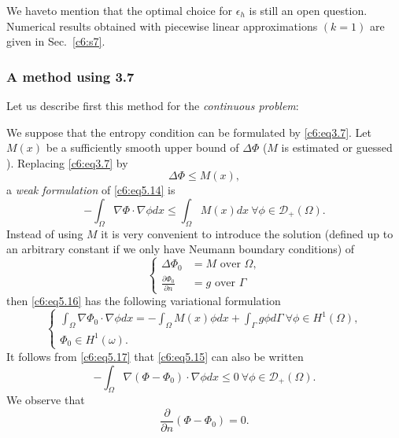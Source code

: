 We have\pageoriginale  to mention that the optimal choice for $\epsilon_h$ is still 
an open question. Numerical results obtained with piecewise linear 
approximations $(k=1)$ are given in Sec.~\ref{c6:s7}.  

\subsubsection{A method using 3.7}\label{c6:sss5.3.2}
Let us describe first this method for the \textit{continuous problem}: 

We suppose that the entropy condition can be formulated by 
\eqref{c6:eq3.7}. Let $M(x)$ be a sufficiently smooth upper bound of 
$\Delta \Phi$ ($M$ is estimated or guessed ). Replacing \eqref{c6:eq3.7} by   
\begin{equation}
\Delta \Phi \leq M (x),\tag{5.14}\label{c6:eq5.14}
\end{equation}
a \textit{weak formulation} of \eqref{c6:eq5.14} is 
\begin{equation}
- \int_\Omega \nabla \Phi \cdot \nabla \phi dx \leq 
\int_\Omega M(x) dx~ \forall \phi \in \mathscr{D}_+ (\Omega ).  
\tag{5.15}\label{c6:eq5.15}  
\end{equation}
Instead of using $M$ it is very convenient to introduce the solution 
(defined up to an arbitrary constant if we only have Neumann boundary 
conditions) of   
\begin{equation}
\begin{cases}
\Delta \Phi_0 &= M \text{ over }\Omega,\\
\frac{\partial \Phi_0}{\partial n} &= g \text{ over } \Gamma
\end{cases}
\tag{5.16}\label{c6:eq5.16}
\end{equation}
then \eqref{c6:eq5.16} has the following variational formulation 
\begin{equation}
\begin{cases}
\int_\Omega \nabla \Phi_0 \cdot \nabla \phi dx = - 
\int_\Omega M(x) \phi dx + \int_\Gamma g \phi d \Gamma ~ \forall \phi 
\in H^1 (\Omega ),\\  
\Phi_0 \in H^1 (\omega ).  
\end{cases}
\tag{5.17}\label{c6:eq5.17}
\end{equation}
It follows from \eqref{c6:eq5.17} that \eqref{c6:eq5.15} can also be 
written  
\begin{equation}
- \int_\Omega \nabla (\Phi - \Phi_0 ) \cdot \nabla \phi 
dx \leq 0 ~ \forall \phi \in \mathscr{D}_+ (\Omega ).  
\tag{5.18}\label{c6:eq5.18}  
\end{equation}
We observe that 
\begin{equation}
\frac{\partial}{\partial n}(\Phi - \Phi_0 ) = 0. 
\tag{5.19}\label{c6:eq5.19} 
\end{equation}

